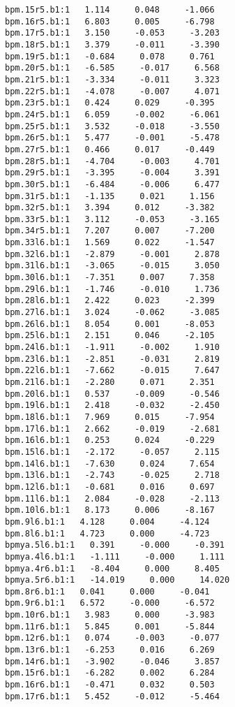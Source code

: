 \begin{verbatim}
bpm.15r5.b1:1   1.114     0.048     -1.066
bpm.16r5.b1:1   6.803     0.005     -6.798
bpm.17r5.b1:1   3.150     -0.053     -3.203
bpm.18r5.b1:1   3.379     -0.011     -3.390
bpm.19r5.b1:1   -0.684     0.078     0.761
bpm.20r5.b1:1   -6.585     -0.017     6.568
bpm.21r5.b1:1   -3.334     -0.011     3.323
bpm.22r5.b1:1   -4.078     -0.007     4.071
bpm.23r5.b1:1   0.424     0.029     -0.395
bpm.24r5.b1:1   6.059     -0.002     -6.061
bpm.25r5.b1:1   3.532     -0.018     -3.550
bpm.26r5.b1:1   5.477     -0.001     -5.478
bpm.27r5.b1:1   0.466     0.017     -0.449
bpm.28r5.b1:1   -4.704     -0.003     4.701
bpm.29r5.b1:1   -3.395     -0.004     3.391
bpm.30r5.b1:1   -6.484     -0.006     6.477
bpm.31r5.b1:1   -1.135     0.021     1.156
bpm.32r5.b1:1   3.394     0.012     -3.382
bpm.33r5.b1:1   3.112     -0.053     -3.165
bpm.34r5.b1:1   7.207     0.007     -7.200
bpm.33l6.b1:1   1.569     0.022     -1.547
bpm.32l6.b1:1   -2.879     -0.001     2.878
bpm.31l6.b1:1   -3.065     -0.015     3.050
bpm.30l6.b1:1   -7.351     0.007     7.358
bpm.29l6.b1:1   -1.746     -0.010     1.736
bpm.28l6.b1:1   2.422     0.023     -2.399
bpm.27l6.b1:1   3.024     -0.062     -3.085
bpm.26l6.b1:1   8.054     0.001     -8.053
bpm.25l6.b1:1   2.151     0.046     -2.105
bpm.24l6.b1:1   -1.911     -0.002     1.910
bpm.23l6.b1:1   -2.851     -0.031     2.819
bpm.22l6.b1:1   -7.662     -0.015     7.647
bpm.21l6.b1:1   -2.280     0.071     2.351
bpm.20l6.b1:1   0.537     -0.009     -0.546
bpm.19l6.b1:1   2.418     -0.032     -2.450
bpm.18l6.b1:1   7.969     0.015     -7.954
bpm.17l6.b1:1   2.662     -0.019     -2.681
bpm.16l6.b1:1   0.253     0.024     -0.229
bpm.15l6.b1:1   -2.172     -0.057     2.115
bpm.14l6.b1:1   -7.630     0.024     7.654
bpm.13l6.b1:1   -2.743     -0.025     2.718
bpm.12l6.b1:1   -0.681     0.016     0.697
bpm.11l6.b1:1   2.084     -0.028     -2.113
bpm.10l6.b1:1   8.173     0.006     -8.167
bpm.9l6.b1:1   4.128     0.004     -4.124
bpm.8l6.b1:1   4.723     0.000     -4.723
bpmya.5l6.b1:1   0.391     -0.000     -0.391
bpmya.4l6.b1:1   -1.111     -0.000     1.111
bpmya.4r6.b1:1   -8.404     0.000     8.405
bpmya.5r6.b1:1   -14.019     0.000     14.020
bpm.8r6.b1:1   0.041     0.000     -0.041
bpm.9r6.b1:1   6.572     -0.000     -6.572
bpm.10r6.b1:1   3.983     0.000     -3.983
bpm.11r6.b1:1   5.845     0.001     -5.844
bpm.12r6.b1:1   0.074     -0.003     -0.077
bpm.13r6.b1:1   -6.253     0.016     6.269
bpm.14r6.b1:1   -3.902     -0.046     3.857
bpm.15r6.b1:1   -6.282     0.002     6.284
bpm.16r6.b1:1   -0.471     0.032     0.503
bpm.17r6.b1:1   5.452     -0.012     -5.464

\end{verbatim}
